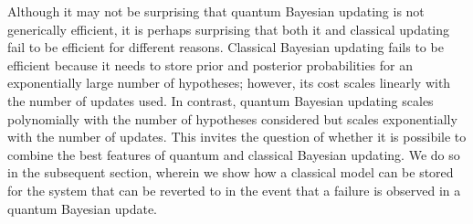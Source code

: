 \documentclass[aps,amsmath,onecolumn,amssymb,notitlepage]{revtex4-1}
\begin{document}
Although it may not be surprising that quantum Bayesian updating is not generically efficient, it is perhaps surprising that both it and classical updating fail to be efficient for different reasons.  Classical Bayesian updating fails to be efficient because it needs to store prior and posterior probabilities for an exponentially large number of hypotheses; however, its cost scales linearly with the number of updates used.  In contrast, quantum Bayesian updating scales polynomially with the number of hypotheses considered but scales exponentially with the number of updates.  This invites the question of whether it is possibile to combine the best features of quantum and classical Bayesian updating.  We do so in the subsequent section, wherein we show how a classical model can be stored for the system that can be reverted to in the event that a failure is observed in a quantum Bayesian update.



%

\end{document}
